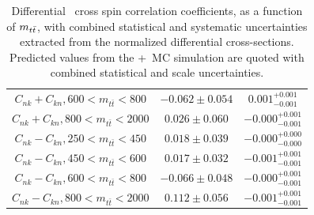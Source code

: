 \begin{table}[htb]
\begin{tabular}{c | c c}
$C_{nk}+C_{kn}, {600 < m_{t\bar{t}} < 800}$ & $-0.062 \pm 0.054$ & $0.001^{+0.001}_{-0.001}$ \\
$C_{nk}+C_{kn}, {800 < m_{t\bar{t}} < 2000}$ & $0.026 \pm 0.060$ & $-0.000^{+0.001}_{-0.001}$ \\
$C_{nk}-C_{kn}, {250 < m_{t\bar{t}} < 450}$ & $0.018 \pm 0.039$ & $-0.000^{+0.000}_{-0.000}$ \\
$C_{nk}-C_{kn}, {450 < m_{t\bar{t}} < 600}$ & $0.017 \pm 0.032$ & $-0.001^{+0.001}_{-0.001}$ \\
$C_{nk}-C_{kn}, {600 < m_{t\bar{t}} < 800}$ & $-0.066 \pm 0.048$ & $-0.000^{+0.001}_{-0.001}$ \\
$C_{nk}-C_{kn}, {800 < m_{t\bar{t}} < 2000}$ & $0.112 \pm 0.056$ & $-0.001^{+0.001}_{-0.001}$ \\
\hline
\end{tabular}
    \caption{
    Differential \ttbar\ cross spin correlation coefficients, as a function of $m_{t\bar{t}}$, with combined statistical and systematic uncertainties extracted from the normalized differential cross-sections. 
    Predicted values from the \Powheg+\Pythia\ MC simulation are quoted with combined statistical and scale uncertainties.
    }
    \label{tab:Extracted_Coefficients_2D_Cross_Spin_Correlations}
\end{table}


